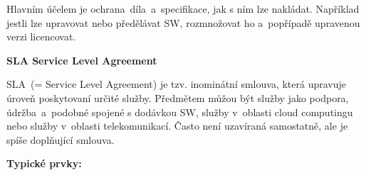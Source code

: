 Hlavním účelem je ochrana~díla~a~specifikace, jak s ním lze nakládat. Například jestli lze upravovat nebo předělávat SW, rozmnožovat ho a~popřípadě upravenou verzi licencovat. 
\clearpage


\begin{Large}
\textbf{SLA Service Level Agreement}
\end{Large}


SLA~(= Service Level Agreement) je tzv. inominátní smlouva, která upravuje úroveň poskytovaní určité služby. Předmětem můžou být služby jako podpora, údržba~a~podobné spojené s dodávkou SW, služby v~oblasti cloud computingu nebo služby v~oblasti telekomunikací. Často není uzavíraná samostatně, ale je spíše doplňující smlouva.
\newline

\noindent\textbf{Typické prvky:}
